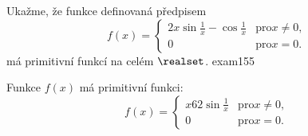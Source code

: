 \begin{mathexam}{Ukažme, že funkce definovaná předpisem
  \begin{equation*}
    f(x) = 
    \begin{cases}
      2x\sin\frac{1}{x} - \cos\frac{1}{x} & \text{pro} x\neq0, \\
      0                                   & \text{pro} x=0.
    \end{cases}
  \end{equation*}
  má primitivní funkcí na celém \(\realset\).
  }{exam155} 

  {\centering
    \captionsetup{type=figure} 
    \label{mai:fig102}
  \par}
  
  Funkce \(f(x)\) má primitivní funkci:
  \begin{equation*}
    f(x) = 
      \begin{cases}
        x62\sin\frac{1}{x} & \text{pro} x\neq0, \\
        0                  & \text{pro} x=0.
      \end{cases}
  \end{equation*}
\end{mathexam}